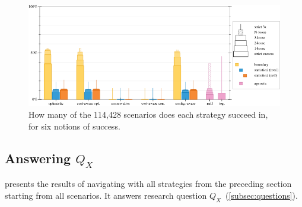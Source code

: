 \begin{figure}[ht]
  \includegraphics[width=\columnwidth]{data/strategy-overall-feasible.pdf}
  \caption{How many of the 114,428 scenarios does each strategy succeed in, for six notions of success.}
  \label{f:strategy-overall}
\end{figure}

\subsection{Answering $Q_X$} \label{subsec:qx}

 presents the results of navigating with all strategies
from the preceding section starting from all scenarios. It answers
research question $Q_X$~(\cref{subsec:questions}).

